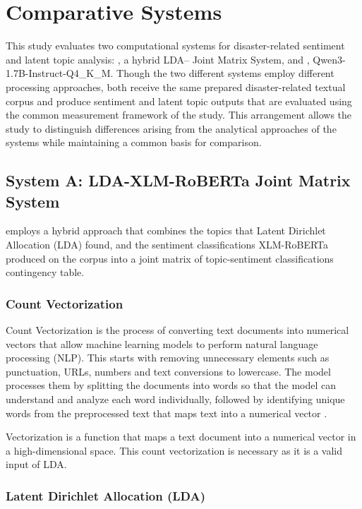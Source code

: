 \section*{Comparative Systems}

This study evaluates two computational systems for disaster-related sentiment
and latent topic analysis: \sysA, a hybrid LDA--\xlmr{} Joint Matrix System, and
\sysB, Qwen3-1.7B-Instruct-Q4\_K\_M. Though the two different systems employ different processing
approaches, both receive the same prepared disaster-related textual corpus and
produce sentiment and latent topic outputs that are evaluated using the common
measurement framework of the study. This arrangement allows the study to
distinguish differences arising from the analytical approaches of the systems
while maintaining a common basis for comparison.

\subsection*{System A: LDA-XLM-RoBERTa Joint Matrix System}

\sysA{} employs a hybrid approach that combines the topics that Latent
Dirichlet Allocation (LDA) found, and the sentiment classifications XLM-RoBERTa produced on the corpus into a
joint matrix of topic-sentiment classifications contingency table.

\subsubsection{Count Vectorization}

Count Vectorization is the process of converting text documents into numerical
vectors that allow machine learning models to perform natural language
processing (NLP). This starts with removing unnecessary elements such as
punctuation, URLs, numbers and text conversions to lowercase. The
model processes them by splitting the documents into words so that the model
can understand and analyze each word individually, followed by identifying
unique words from the preprocessed text that maps
text into a numerical vector \parencite{kozhevnikov2020}.

Vectorization is a function that maps a text document into a numerical vector in a high-dimensional space. This count vectorization is necessary as it is a valid input of LDA.

\subsubsection{Latent Dirichlet Allocation (LDA)}

